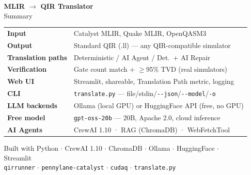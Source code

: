 \documentclass[aspectratio=169,10pt]{beamer}
\begin{document}
\begin{frame}[plain]
  \begin{center}
    \vspace{1.5cm}
    {\LARGE\bfseries\color{mlirblue} MLIR $\to$ QIR Translator}\\[0.5cm]
    {\large Summary}\\[0.8cm]
    \begin{tabular}{@{}lp{7.5cm}@{}}
      \toprule
      \textbf{Input} & Catalyst MLIR, Quake MLIR, OpenQASM3 \\
      \textbf{Output} & Standard QIR (.ll) --- any QIR-compatible simulator \\
      \textbf{Translation paths} & Deterministic / AI Agent / Det.\ + AI Repair \\
      \textbf{Verification} & Gate count match + $\ge$95\% TVD (real simulators) \\
      \textbf{Web UI} & Streamlit, shareable, Translation Path metric, logging \\
      \textbf{CLI} & \texttt{translate.py} --- file/stdin/\texttt{-{}-json}/\texttt{-{}-model}/\texttt{-o} \\
      \textbf{LLM backends} & Ollama (local GPU) or HuggingFace API (free, no GPU)\\
      \textbf{Free model} & \texttt{gpt-oss-20b} --- 20B, Apache 2.0, cloud inference \\
      \textbf{AI Agents} & CrewAI 1.10 · RAG (ChromaDB) · WebFetchTool \\
      \bottomrule
    \end{tabular}
    \vspace{0.6cm}
    {\small Built with Python $\cdot$ CrewAI 1.10 $\cdot$ ChromaDB $\cdot$ Ollama $\cdot$ HuggingFace $\cdot$ Streamlit}\\[0.2cm]
    {\small \texttt{qirrunner} $\cdot$ \texttt{pennylane-catalyst} $\cdot$ \texttt{cudaq} $\cdot$ \texttt{translate.py}}
  \end{center}
\end{frame}
\end{document}
